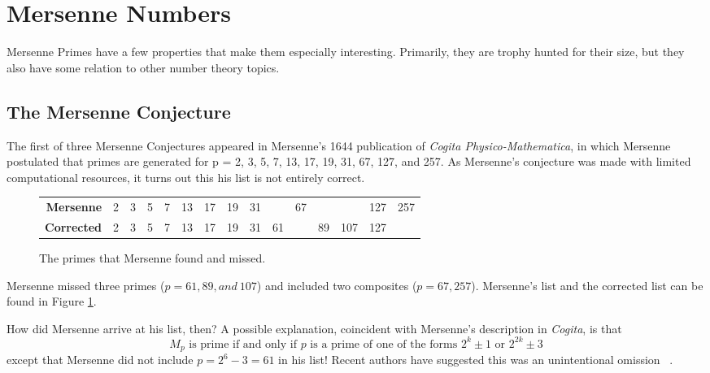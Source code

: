 \section{Mersenne Numbers}

Mersenne Primes have a few properties that make them especially interesting. Primarily, they
are trophy hunted for their size, but they also have some relation to other number theory topics.

\subsection{The Mersenne Conjecture}
The first of three Mersenne Conjectures appeared in Mersenne’s 1644 publication of 
\textit{Cogita Physico-Mathematica}, in which Mersenne postulated that primes are generated for p = 2, 3, 5,
7, 13, 17, 19, 31, 67, 127, and 257. As Mersenne's conjecture was made with limited computational
resources, it turns out this his list is not entirely correct.
\begin{figure}[h]
\begin{tabular}{rcccccccccccccc}
\textbf{Mersenne}&2&3&5&7&13&17&19&31&&67&&&127&257\\
\textbf{Corrected}&2&3&5&7&13&17&19&31&61&&89&107&127&
\end{tabular}
\caption{The primes that Mersenne found and missed.}
\label{fig:conj}
\end{figure}

Mersenne missed three primes ($p = 61, 89, and~107$) and included two composites ($p = 67, 257$). Mersenne's list and the corrected list can be found in Figure \ref{fig:conj}.

How did Mersenne arrive at his list, then? A possible explanation, coincident with Mersenne's description in
\textit{Cogita}, is that
\begin{equation*}
    M_p \text{ is prime if and only if $p$ is a prime of one of the forms } 2^k\pm1 \text{ or } 2^{2k}\pm3
\end{equation*}
except that Mersenne did not include $p = 2^{6}-3 = 61$ in his list! Recent authors have
suggested this was an unintentional omission ~\cite{newconjecture}.


